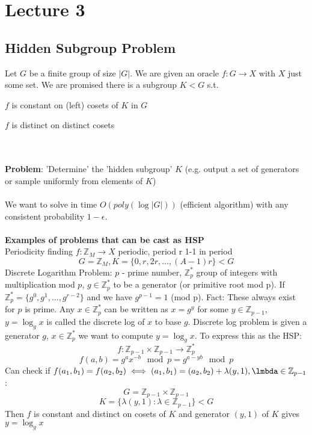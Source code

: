 \documentclass{article}
\begin{document}
\section{Lecture 3}
\subsection{Hidden Subgroup Problem}
Let $G$ be a finite group of size $|G|$. We are given an oracle $f: G \rightarrow X$ with $X$ just some set. We are promised there is a subgroup $K<G$ s.t.
\begin{itemise}
\item $f$ is constant on (left) cosets of $K$ in $G$
\item $f$ is distinct on distinct cosets
\end{itemise}\\\\
\textbf{Problem}: 'Determine' the 'hidden subgroup' $K$ (e.g. output a set of generators or sample uniformly from elements of $K$)\\\\
We want to solve in time $O(poly ( \log |G|))$ (efficient algorithm) with any consistent probability $1-\epsilon$.
\\\\
\textbf{Examples of problems that can be cast as HSP}\\
Periodicity finding $f: \mathbb{Z}_M \rightarrow X$ periodic, period r 1-1 in period
$$
G = \mathbb{Z}_M, K = \{ 0,r,2r,..., (A-1)r\} < G
$$
Discrete Logarithm Problem: $p$ - prime number, $\mathbb{Z}^*_p$ group of integers with multiplication mod $p$, $g \in \mathbb{Z}_p^*$ to be a generator (or primitive root mod p). If $\mathbb{Z}^*_p = \{ g^0, g^1, ..., g^{r-2} \}$ and we have $g^{p-1} = 1$ (mod p). Fact: These always exist for $p$ is prime. Any $x \in \mathbb{Z}_p^*$ can be written as $x = g^y$ for some $y \in \mathbb{Z}_{p-1}$, $y = \log_g x$ is called the discrete log of $x$ to base $g$. Discrete log problem is given a generator $g$, $x \in \mathbb{Z}^*_p$ we want to compute $y = \log_g x$. To express this as the HSP:
$$
f: \mathbb{Z}_{p-1} \times \mathbb{Z}_{p-1} \rightarrow \mathbb{Z}_p^*
$$
$$
f(a,b) = g^a x^{-b} \mod p = g^{a-yb} \mod p
$$
Can check if $f(a_1, b_1) = f(a_2, b_2) \iff (a_1, b_1) = (a_2, b_2) + \lambda( y, 1), \lmbda \in \mathbb{Z}_{p-1}$:
$$
G = \mathbb{Z}_{p-1} \times \mathbb{Z}_{p-1}
$$
$$
K = \{ \lambda(y,1): \lambda \in \mathbb{Z}_{p-1} \} < G
$$
Then $f$ is constant and distinct on cosets of $K$ and generator $(y,1)$ of $K$ gives $y = \log_g x$\\\\
\end{document}
